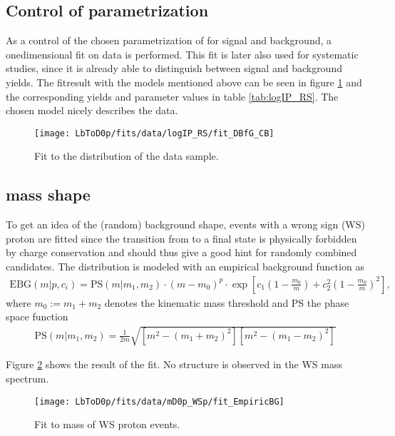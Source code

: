 \subsection{Control of \logIP parametrization}
\label{sec:ControlLogIP}
As a control of the chosen parametrization of \logIP for signal and background, a onedimensional fit on data is performed. 
This fit is later also used for systematic studies, since it is already able to distinguish between signal and background yields.
The fitresult with the models mentioned above can be seen in figure \ref{fig:fit_logIP_RS} and the corresponding yields and parameter values in table \ref{tab:logIP_RS}.
The chosen model nicely describes the data.
\begin{figure}[hptb]
    \centering
	\texttt{[image: LbToD0p/fits/data/logIP\_RS/fit\_DBfG\_CB]}
	\caption{Fit to the \logIP distribution of the data sample.}
    \label{fig:fit_logIP_RS}
\end{figure}



\subsection{\Dz\proton mass shape}
To get an idea of the (random) background shape, events with a wrong sign (WS) proton are fitted since the transition from \Lb to a \Dz\antiproton\mun final state is physically forbidden by charge conservation and should thus give a good hint for randomly combined \LbToDpmunu candidates. 
The distribution is modeled with an empirical background function as
\begin{align}
    \text{EBG}(m|p,c_i) = \text{PS}(m|m_1,m_2) \cdot (m - m_0)^p \cdot \exp\left[ c_1 \left(1-\frac{m_0}{m}\right) + c_2^2 \left(1-\frac{m_0}{m}\right)^2 \right], \label{eq:EBG}
\end{align}
where $m_0 := m_1 + m_2$ denotes the kinematic \Dz\proton mass threshold and PS the phase space function
\begin{align}
    \text{PS}(m|m_1,m_2) = \frac{1}{2m} \sqrt{\left[m^2 - (m_1 + m_2)^2\right] \left[m^2 - (m_1 - m_2)^2\right]} \label{eq:PS}
\end{align}

Figure \ref{fig:fit_mD0p_WS} shows the result of the fit. 
No structure is observed in the WS mass spectrum.
\begin{figure}[hptb]
    \centering
	\texttt{[image: LbToD0p/fits/data/mD0p\_WSp/fit\_EmpiricBG]}
	\caption{Fit to \Dz\proton mass of WS proton events.}
    \label{fig:fit_mD0p_WS}
\end{figure}

